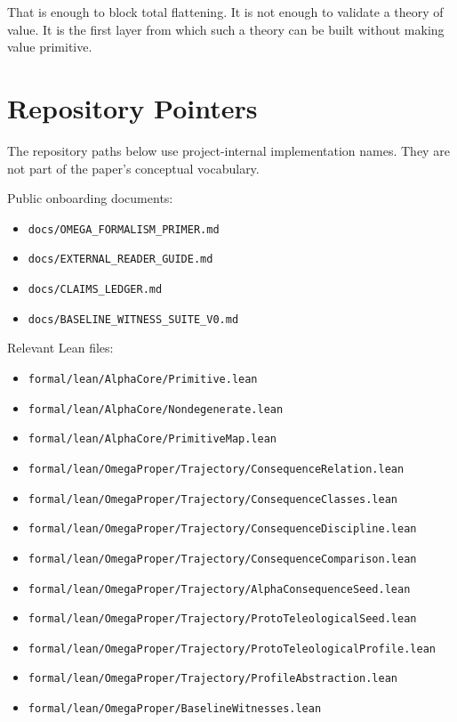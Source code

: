 \documentclass[11pt]{article}
\begin{document}
That is enough to block total flattening. It is not enough to validate a theory
of value. It is the first layer from which such a theory can be built without
making value primitive.

\appendix

\section{Repository Pointers}

The repository paths below use project-internal implementation names. They are
not part of the paper's conceptual vocabulary.

Public onboarding documents:

\begin{itemize}[leftmargin=*]
  \item \texttt{docs/OMEGA\_FORMALISM\_PRIMER.md}
  \item \texttt{docs/EXTERNAL\_READER\_GUIDE.md}
  \item \texttt{docs/CLAIMS\_LEDGER.md}
  \item \texttt{docs/BASELINE\_WITNESS\_SUITE\_V0.md}
\end{itemize}

Relevant Lean files:

\begin{itemize}[leftmargin=*]
  \item \texttt{formal/lean/AlphaCore/Primitive.lean}
  \item \texttt{formal/lean/AlphaCore/Nondegenerate.lean}
  \item \texttt{formal/lean/AlphaCore/PrimitiveMap.lean}
  \item \texttt{formal/lean/OmegaProper/Trajectory/ConsequenceRelation.lean}
  \item \texttt{formal/lean/OmegaProper/Trajectory/ConsequenceClasses.lean}
  \item \texttt{formal/lean/OmegaProper/Trajectory/ConsequenceDiscipline.lean}
  \item \texttt{formal/lean/OmegaProper/Trajectory/ConsequenceComparison.lean}
  \item \texttt{formal/lean/OmegaProper/Trajectory/AlphaConsequenceSeed.lean}
  \item \texttt{formal/lean/OmegaProper/Trajectory/ProtoTeleologicalSeed.lean}
  \item \texttt{formal/lean/OmegaProper/Trajectory/ProtoTeleologicalProfile.lean}
  \item \texttt{formal/lean/OmegaProper/Trajectory/ProfileAbstraction.lean}
  \item \texttt{formal/lean/OmegaProper/BaselineWitnesses.lean}
\end{itemize}
\end{document}
